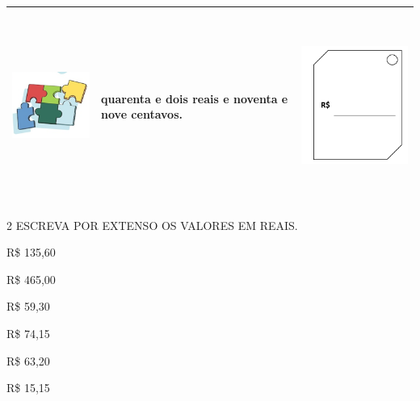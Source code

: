 
\begin{longtable}[]{@{}lll@{}}
\toprule
\includegraphics[width=1.60439in,height=1.38561in]{media/image59.png} &
quarenta e dois reais e noventa e nove centavos. &
\includegraphics[width=2.19822in,height=2.44826in]{media/image56.png}\tabularnewline
\bottomrule
\end{longtable}


\num{2} ESCREVA POR EXTENSO OS VALORES EM REAIS.


\begin{escolha}
\item R\$ 135,60 

\item R\$ 465,00 

\item R\$ 59,30 

\item R\$ 74,15 

\item R\$ 63,20 

\item R\$ 15,15 
\end{escolha}

